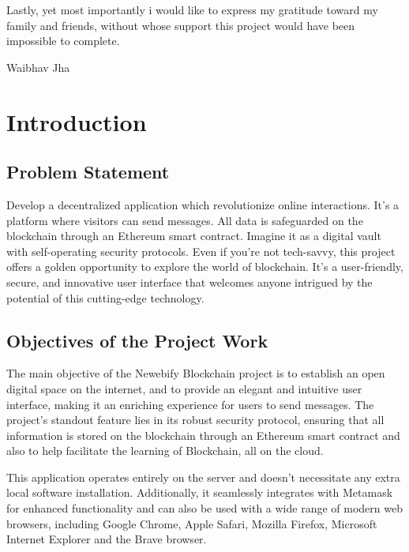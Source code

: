 \documentclass[12pt,a4paper]{article}
\begin{document}
Lastly, yet most importantly i would like to express my gratitude toward my family and friends, without whose support this project would have been impossible to complete.

\begin{flushright}
{
Waibhav Jha
}
\end{flushright}


\newpage
\tableofcontents
\thispagestyle{empty}

\newpage
{}
\setcounter{page}{1}

\section{Introduction}
\subsection{Problem Statement}
Develop a decentralized application which revolutionize online interactions. It's a platform where visitors can send messages. All data is safeguarded on the blockchain through an Ethereum smart contract. Imagine it as a digital vault with self-operating security protocols. Even if you're not tech-savvy, this project offers a golden opportunity to explore the world of blockchain. It's a user-friendly, secure, and innovative user interface that welcomes anyone intrigued by the potential of this cutting-edge technology.

\subsection{Objectives of the Project Work}
The main objective of the Newebify Blockchain project is to establish an open digital space on the internet, and to provide an elegant and intuitive user interface, making it an enriching experience for users to send messages. The project's standout feature lies in its robust security protocol, ensuring that all information is stored on the blockchain through an Ethereum smart contract and also to help facilitate the learning of Blockchain, all on the cloud.\cite{cloud}

This application operates entirely on the server and doesn't necessitate any extra local software installation. Additionally, it seamlessly integrates with Metamask for enhanced functionality and can also be used with a wide range of modern web browsers, including Google Chrome, Apple Safari, Mozilla Firefox, Microsoft Internet Explorer and the Brave browser.
\end{document}

